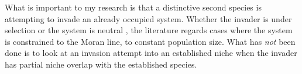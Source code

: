 What is important to my research is that a distinctive second species is attempting to invade an already occupied system. 
Whether the invader is under selection \cite{Kimura1955} or the system is neutral \cite{Kimura1956,Hubbell2001}, the literature regards cases where the system is constrained to the Moran line, to constant population size. 
What has \emph{not} been done is to look at an invasion attempt into an established niche when the invader has partial niche overlap with the established species. 

